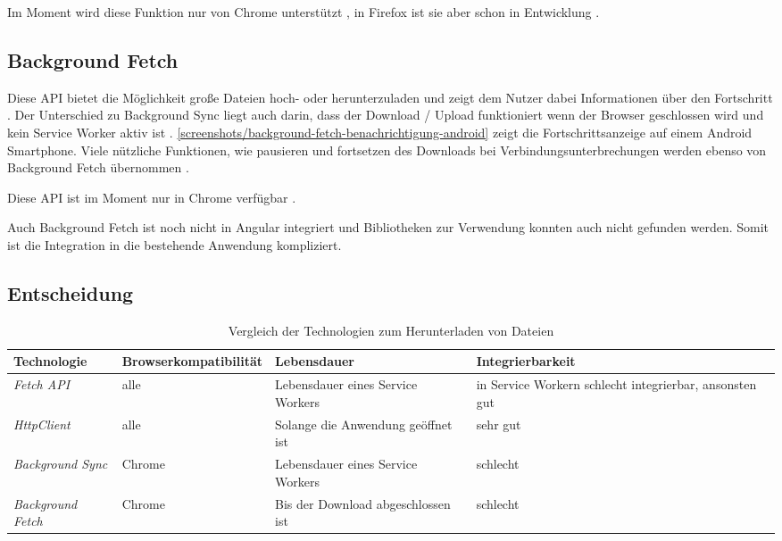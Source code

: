 Im Moment wird diese Funktion nur von Chrome unterstützt \autocite{caniuse-background-sync}, in Firefox ist sie aber schon in Entwicklung \autocite{status-mozilla-background-sync}.

\subsection{Background Fetch}
Diese \ac{API} bietet die Möglichkeit große Dateien hoch- oder herunterzuladen und zeigt dem Nutzer dabei Informationen über den Fortschritt \autocite{google-background-fetch}. Der Unterschied zu Background Sync liegt auch darin, dass der Download / Upload funktioniert wenn der Browser geschlossen wird und kein Service Worker aktiv ist \autocite{google-background-fetch}. \autoref{screenshots/background-fetch-benachrichtigung-android} zeigt die Fortschrittsanzeige auf einem Android Smartphone. Viele nützliche Funktionen, wie pausieren und fortsetzen des Downloads bei Verbindungsunterbrechungen werden ebenso von Background Fetch übernommen \autocite{google-background-fetch}. 


Diese \ac{API} ist im Moment nur in Chrome verfügbar \autocite{google-background-fetch}.

Auch Background Fetch ist noch nicht in Angular integriert und Bibliotheken zur Verwendung konnten auch nicht gefunden werden. Somit ist die Integration in die bestehende Anwendung kompliziert.

\subsection{Entscheidung}

\begin{table}[h]
  \renewcommand{\arraystretch}{1.2}
  \centering
  \sffamily
  \begin{footnotesize}
    \begin{tabularx}{0.9\textwidth}{l L L L}
      \toprule
      \textbf{Technologie} & \textbf{Browserkompatibilität} & \textbf{Lebensdauer} & \textbf{Integrierbarkeit} \\
      \midrule
      \emph{Fetch \ac{API}} & alle & Lebensdauer eines Service Workers & in Service Workern schlecht integrierbar, ansonsten gut \\
      \emph{HttpClient} & alle & Solange die Anwendung geöffnet ist & sehr gut \\
      \emph{Background Sync} & Chrome & Lebensdauer eines Service Workers & schlecht \\
      \emph{Background Fetch} & Chrome & Bis der Download abgeschlossen ist & schlecht \\
      \bottomrule
    \end{tabularx}
  \end{footnotesize}
  \rmfamily
  \caption{Vergleich der Technologien zum Herunterladen von Dateien}
  \label{Kap4:DownloadTechnologien}
\end{table}

